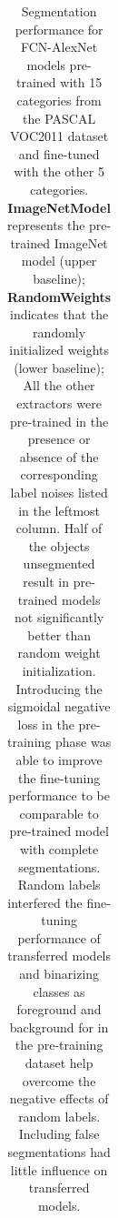\begin{table}[t]
{\begin{tabular}{l|l|llll|l}
\end{tabular}
}
\caption{
Segmentation performance for FCN-AlexNet models pre-trained with 15 categories from the PASCAL VOC2011 dataset and fine-tuned with the other 5 categories.
\textbf{ImageNetModel} represents the pre-trained ImageNet model (upper baseline);
\textbf{RandomWeights} indicates that the randomly initialized weights (lower baseline);
All the other extractors were pre-trained in the presence or absence of the corresponding label noises listed in the leftmost column.
Half of the objects unsegmented result in pre-trained models not significantly better than random weight initialization.
Introducing the sigmoidal negative loss in the pre-training phase was able to improve the fine-tuning performance to be comparable to pre-trained model with complete segmentations.
Random labels interfered the fine-tuning performance of transferred models and binarizing classes as foreground and background for in the pre-training dataset help overcome the negative effects of random labels.
Including false segmentations had little influence on transferred models.
}
\label{tab:robustness}
\end{table}


